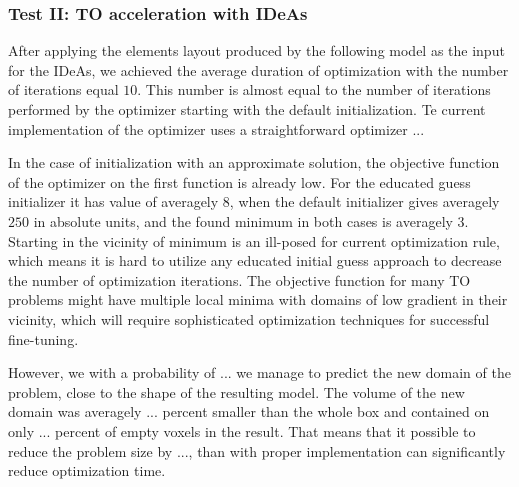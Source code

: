 \subsubsection{Test II: TO acceleration with IDeAs}

After applying the elements layout produced by the following model as the input for the IDeAs, we achieved the average duration of optimization with the number of iterations equal $10$. 
This number is almost equal to the number of iterations performed by the optimizer starting with the default initialization. 
Te current implementation of the optimizer uses a straightforward optimizer ...
\medskip

In the case of initialization with an approximate solution, the objective function of the optimizer on the first function is already low. 
For the educated guess initializer it has value of averagely $8$, when the default initializer gives averagely $250$ in absolute units, and the found minimum in both cases is averagely $3$.
Starting in the vicinity of minimum is an ill-posed for current optimization rule, which means it is hard to utilize any educated initial guess approach to decrease the number of optimization iterations.
The objective function for many TO problems might have multiple local minima with domains of low gradient in their vicinity, which will require sophisticated optimization techniques for successful fine-tuning.

However, we with a probability of ... we manage to predict the new domain of the problem, close to the shape of the resulting model. 
The volume of the new domain was averagely ... percent smaller than the whole box and contained on only ... percent of empty voxels in the result.
That means that it possible to reduce the problem size by ..., than with proper implementation can significantly reduce optimization time. 

 


